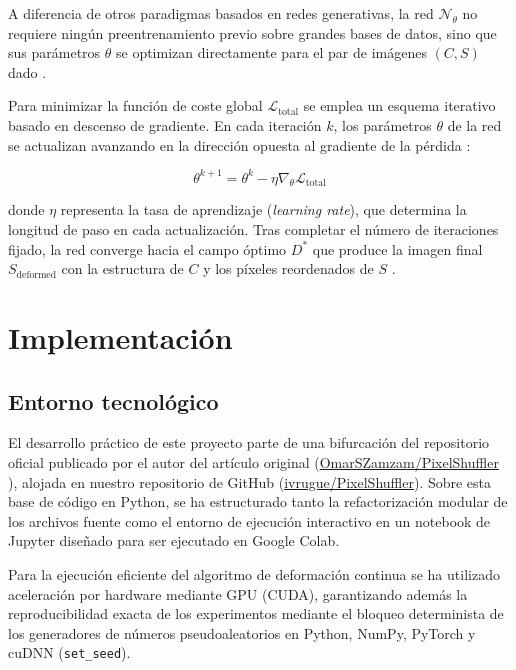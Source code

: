 \documentclass[a4paper]{article}
\begin{document}
\noindent A diferencia de otros paradigmas basados en redes generativas, la red $\mathcal{N}_\theta$ no requiere ningún preentrenamiento previo sobre grandes bases de datos, sino que sus parámetros $\theta$ se optimizan directamente para el par de imágenes $(C, S)$ dado \cite{zamzam2025pixelshuffler}.

\vspace{0.3cm}

\noindent Para minimizar la función de coste global $\mathcal{L}_{\text{total}}$ se emplea un esquema iterativo basado en descenso de gradiente. En cada iteración $k$, los parámetros $\theta$ de la red se actualizan avanzando en la dirección opuesta al gradiente de la pérdida \cite{zamzam2025pixelshuffler}:

\[
\theta^{k + 1} = \theta^k - \eta \nabla_{\theta} \mathcal{L}_{\text{total}}
\]

\noindent donde $\eta$ representa la tasa de aprendizaje (\textit{learning rate}), que determina la longitud de paso en cada actualización. Tras completar el número de iteraciones fijado, la red converge hacia el campo óptimo $D^*$ que produce la imagen final $S_{\text{deformed}}$ con la estructura de $C$ y los píxeles reordenados de $S$ \cite{zamzam2025pixelshuffler}.

\section{Implementación}

\subsection{Entorno tecnológico}

\noindent El desarrollo práctico de este proyecto parte de una bifurcación del repositorio oficial publicado por el autor del artículo original (\href{https://github.com/OmarSZamzam/PixelShuffler}{OmarSZamzam/PixelShuffler} \cite{zamzam2025repo}), alojada en nuestro repositorio de GitHub (\href{https://github.com/ivrugue/PixelShuffler}{ivrugue/PixelShuffler}). Sobre esta base de código en Python, se ha estructurado tanto la refactorización modular de los archivos fuente como el entorno de ejecución interactivo en un notebook de Jupyter diseñado para ser ejecutado en Google Colab.

\vspace{0.3cm}

\noindent Para la ejecución eficiente del algoritmo de deformación continua se ha utilizado aceleración por hardware mediante GPU (CUDA), garantizando además la reproducibilidad exacta de los experimentos mediante el bloqueo determinista de los generadores de números pseudoaleatorios en Python, NumPy, PyTorch y cuDNN (\texttt{set\_seed}).
\end{document}
